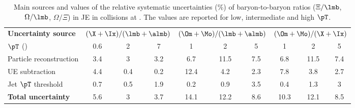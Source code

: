 \documentclass[ALICE,manyauthors]{cernphprep}
\begin{document}
\begin{table}[!ht]
	\begin{center}
		\caption{Main sources and values of the relative systematic uncertainties (\%) of baryon-to-baryon ratios ($\Xi/\lmb$, $\Omega/\lmb$, $\Omega/\Xi$) in JE in \pp collisions at \thirteen.
			The values are reported for low, intermediate and high $\pT$.}
		\label{tab:ppBBRatioUncer}
		\begin{tabularx}{\textwidth}{@{} lCCCCCCCCC @{}}
			\toprule
			\textbf{Uncertainty source} & 
			& 
			&  \\
			\cmidrule(lr){2-4} \cmidrule(lr){5-7} \cmidrule(lr){8-10}
			$\pT$ (\GeVc) & 0.6 & 2 &7  & 1 & 2 & 5 & 1 & 2 & 5 \\
			\midrule
			Particle reconstruction& 3.4& 3& 3.2& 6.7& 11.5& 7.5& 6.8& 11.5& 7.4\\
			UE subtraction& 4.4& 0.4& 0.2& 12.4& 4.2& 2.3& 7.8& 3.8& 2.7\\
			Jet $\pT$ threshold& 0.7& 0.5& 1.9& 0.2& 0.9& 3.5& 0.4& 1.3& 3\\
			\midrule
			\textbf{Total uncertainty}& 5.6& 3& 3.7& 14.1& 12.2& 8.6& 10.3& 12.1& 8.5\\
			\bottomrule
		\end{tabularx}
	\end{center}
\end{table}
\end{document}
